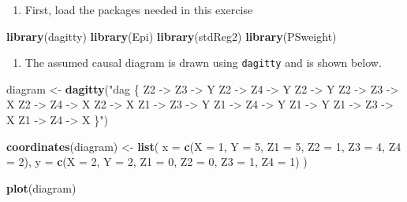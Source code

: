 \documentclass[
]{book}
\newenvironment{Shaded}{\begin{snugshade}}{\end{snugshade}}
\newcommand{\AttributeTok}[1]{\textcolor[rgb]{0.13,0.29,0.53}{#1}}
\newcommand{\DecValTok}[1]{\textcolor[rgb]{0.00,0.00,0.81}{#1}}
\newcommand{\FunctionTok}[1]{\textcolor[rgb]{0.13,0.29,0.53}{\textbf{#1}}}
\newcommand{\NormalTok}[1]{#1}
\newcommand{\OtherTok}[1]{\textcolor[rgb]{0.56,0.35,0.01}{#1}}
\newcommand{\StringTok}[1]{\textcolor[rgb]{0.31,0.60,0.02}{#1}}
\providecommand{\tightlist}{%
  \setlength{\itemsep}{0pt}\setlength{\parskip}{0pt}}
\begin{document}
\begin{enumerate}
\def\labelenumi{\arabic{enumi}.}
\tightlist
\item
  First, load the packages needed in this exercise
\end{enumerate}

\begin{Shaded}
\begin{Highlighting}[]
\FunctionTok{library}\NormalTok{(dagitty)}
\FunctionTok{library}\NormalTok{(Epi)}
\FunctionTok{library}\NormalTok{(stdReg2)}
\FunctionTok{library}\NormalTok{(PSweight)}
\end{Highlighting}
\end{Shaded}

\begin{enumerate}
\def\labelenumi{\arabic{enumi}.}
\setcounter{enumi}{1}
\tightlist
\item
  The assumed causal diagram is drawn using \texttt{dagitty} and is shown
  below.
\end{enumerate}

\begin{Shaded}
\begin{Highlighting}[]
\NormalTok{diagram }\OtherTok{\textless{}{-}}
  \FunctionTok{dagitty}\NormalTok{(}\StringTok{"dag \{}
\StringTok{  Z2 {-}\textgreater{} Z3 {-}\textgreater{} Y}
\StringTok{  Z2 {-}\textgreater{} Z4 {-}\textgreater{} Y}
\StringTok{  Z2 {-}\textgreater{} Y}
\StringTok{  Z2 {-}\textgreater{} Z3 {-}\textgreater{} X}
\StringTok{  Z2 {-}\textgreater{} Z4 {-}\textgreater{} X}
\StringTok{  Z2 {-}\textgreater{} X}
\StringTok{  Z1 {-}\textgreater{} Z3 {-}\textgreater{} Y}
\StringTok{  Z1 {-}\textgreater{} Z4 {-}\textgreater{} Y}
\StringTok{  Z1 {-}\textgreater{} Y}
\StringTok{  Z1 {-}\textgreater{} Z3 {-}\textgreater{} X}
\StringTok{  Z1 {-}\textgreater{} Z4 {-}\textgreater{} X}
\StringTok{\}"}\NormalTok{)}

\FunctionTok{coordinates}\NormalTok{(diagram) }\OtherTok{\textless{}{-}}
  \FunctionTok{list}\NormalTok{(}
    \AttributeTok{x =} \FunctionTok{c}\NormalTok{(}\AttributeTok{X =} \DecValTok{1}\NormalTok{, }\AttributeTok{Y =} \DecValTok{5}\NormalTok{, }\AttributeTok{Z1 =} \DecValTok{5}\NormalTok{, }\AttributeTok{Z2 =} \DecValTok{1}\NormalTok{, }\AttributeTok{Z3 =} \DecValTok{4}\NormalTok{, }\AttributeTok{Z4 =} \DecValTok{2}\NormalTok{),}
    \AttributeTok{y =} \FunctionTok{c}\NormalTok{(}\AttributeTok{X =} \DecValTok{2}\NormalTok{, }\AttributeTok{Y =} \DecValTok{2}\NormalTok{, }\AttributeTok{Z1 =} \DecValTok{0}\NormalTok{, }\AttributeTok{Z2 =} \DecValTok{0}\NormalTok{, }\AttributeTok{Z3 =} \DecValTok{1}\NormalTok{, }\AttributeTok{Z4 =} \DecValTok{1}\NormalTok{)}
\NormalTok{  )}

\FunctionTok{plot}\NormalTok{(diagram)}
\end{Highlighting}
\end{Shaded}
\end{document}
